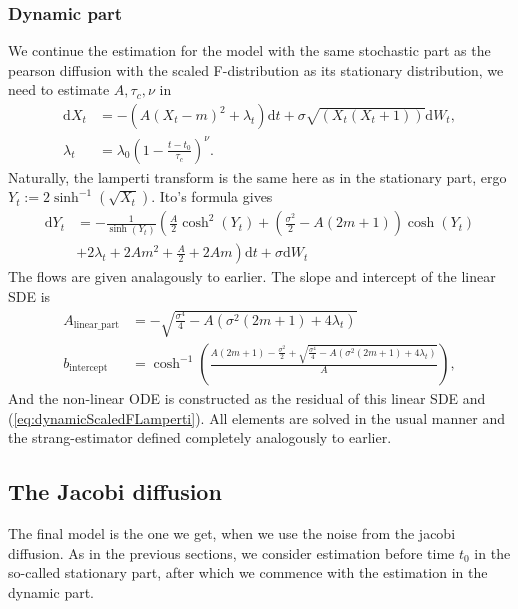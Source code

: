 \subsubsection{Dynamic part}
We continue the estimation for the model with the same stochastic part as the pearson diffusion with the scaled F-distribution as its stationary distribution, we need to estimate $A, \tau_c, \nu$ in
\begin{align}
    \mathrm{d}X_t &= -\left(A(X_t - m)^2 + \lambda_t\right)\mathrm{d}t + \sigma \sqrt{\left(X_t\left(X_t + 1\right)\right)}\mathrm{d}W_t,\\
    \lambda_t &= \lambda_0 \left(1 - \frac{t - t_0}{\tau_c}\right)^\nu.
\end{align}
Naturally, the lamperti transform is the same here as in the stationary part, ergo $Y_t := 2\sinh^{-1}\left(\sqrt{X_t}\right)$. Ito's formula gives 
\begin{align}
    \mathrm{d}Y_t &= - \frac{1}{\sinh\left(Y_t\right)}\left(\frac{A}{2}\cosh^2\left(Y_t\right) + \left(\frac{\sigma^2}{2} - A \left(2m + 1\right)\right)\cosh\left(Y_t\right)\right. \nonumber \\ 
    &+\left. 2\lambda_t + 2Am^2 + \frac{A}{2} + 2Am\right)\mathrm{d}t + \sigma \mathrm{d}W_t \label{eq:dynamicScaledFLamperti}
\end{align}
The flows are given analagously to earlier. The slope and intercept of the linear SDE is
\begin{align}
    A_{\mathrm{linear\_part}} &= -\sqrt{\frac{\sigma^4}{4} - A \left(\sigma^2\left(2m + 1\right) + 4\lambda_t\right)}\\
    b_{\mathrm{intercept}} &= \cosh^{-1}\left(\frac{A\left(2m + 1\right) - \frac{\sigma^2}{2} + \sqrt{\frac{\sigma^4}{4}-A\left(\sigma^2\left(2m + 1\right) + 4 \lambda_t\right)}}{A}\right), \label{eq:FscaledSplitting}
\end{align}
And the non-linear ODE is constructed as the residual of this linear SDE and (\ref{eq:dynamicScaledFLamperti}). All elements are solved in the usual manner and the strang-estimator defined completely analogously to earlier.
\subsection{The Jacobi diffusion}
The final model is the one we get, when we use the noise from the jacobi diffusion. As in the previous sections, we consider estimation before time $t_0$ in the so-called stationary part, after which we commence with the estimation in the dynamic part.

